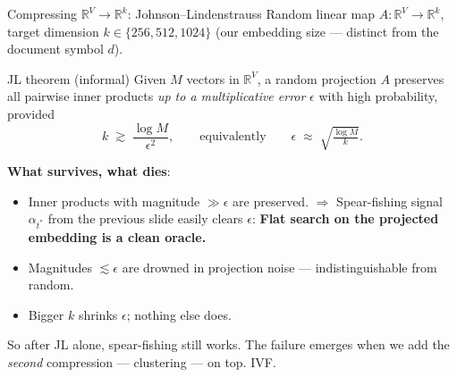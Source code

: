 \begin{frame}{Compressing $\mathbb{R}^V \to \mathbb{R}^k$: Johnson--Lindenstrauss}
  Random linear map $A: \mathbb{R}^V \to \mathbb{R}^k$, target dimension
  $k \in \{256, 512, 1024\}$ (our embedding size --- distinct from the
  document symbol $d$).

  \begin{block}{JL theorem (informal)}
    Given $M$ vectors in $\mathbb{R}^V$, a random projection $A$ preserves
    all pairwise inner products \emph{up to a multiplicative error} $\epsilon$
    with high probability, provided
    \[
      k \;\gtrsim\; \frac{\log M}{\epsilon^2},
      \qquad\text{equivalently}\qquad
      \epsilon \;\approx\; \sqrt{\tfrac{\log M}{k}}.
    \]
  \end{block}

  \textbf{What survives, what dies}:
  \begin{itemize}
    \item Inner products with magnitude \alert{$\gg \epsilon$} are preserved.
          $\Rightarrow$ Spear-fishing signal $\alpha_{t^*}$ from the previous
          slide easily clears $\epsilon$: \textbf{Flat search on the projected
          embedding is a clean oracle.}
    \item Magnitudes \alert{$\lesssim \epsilon$} are drowned in projection
          noise --- indistinguishable from random.
    \item Bigger $k$ shrinks $\epsilon$; nothing else does.
  \end{itemize}

  \medskip
  \small So after JL alone, spear-fishing still works. The failure emerges
  when we add the \emph{second} compression --- clustering --- on top. IVF.
\end{frame}

